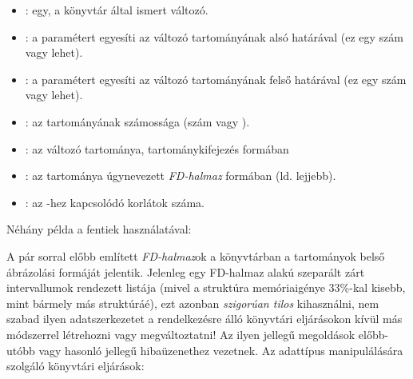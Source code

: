 \begin{itemize}
\item {}:  egy, a \clpfd könyvtár által ismert változó.
\item {}: a  paramétert egyesíti az 
változó tartományának alsó határával (ez egy szám vagy  lehet).
\item {}: a  paramétert egyesíti az 
változó tartományának felső határával (ez egy szám vagy  lehet).
\item {}:  az  tartományának számossága
(szám vagy ).
\item {}:  az  változó tartománya,
tartománykifejezés formában
\item {}:  az  tartománya úgynevezett
\emph{FD-halmaz} formában (ld. lejjebb).
\item {}:  az -hez kapcsolódó korlátok
száma.
\end{itemize}

Néhány példa a fentiek használatával:


A pár sorral előbb említett \emph{FD-halmaz}ok a \clpfd könyvtárban a
tartományok belső ábrázolási formáját jelentik. Jelenleg egy FD-halmaz
 alakú szeparált zárt intervallumok rendezett listája (mivel
a  struktúra memóriaigénye 33\%-kal kisebb, mint bármely más
 struktúráé), ezt azonban \emph{szigorúan tilos} kihasználni, nem
szabad ilyen adatszerkezetet a rendelkezésre álló könyvtári eljárásokon
kívül más módszerrel létrehozni vagy megváltoztatni! Az ilyen jellegű
megoldások előbb-utóbb  vagy hasonló jellegű
hibaüzenethez vezetnek.
\br
Az adattípus manipulálására szolgáló könyvtári eljárások:

